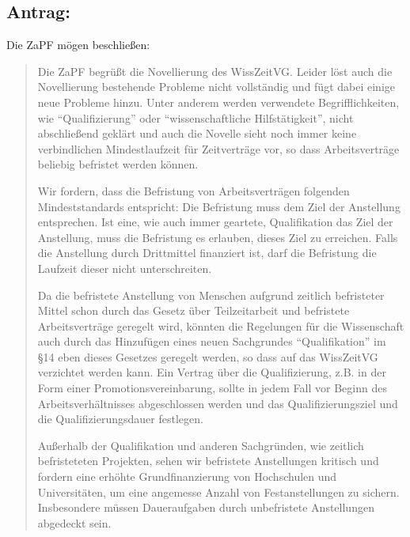 \documentclass[parskip, 10pt,oneside]{scrartcl}
\begin{document}
\subsection*{Antrag:}
Die ZaPF mögen beschließen:
\begin{quote}
Die ZaPF begrüßt die Novellierung des WissZeitVG. Leider löst auch die Novellierung bestehende Probleme nicht vollständig und fügt dabei einige neue Probleme hinzu. 
Unter anderem werden verwendete Begrifflichkeiten, wie ``Qualifizierung'' oder  ``wissenschaftliche Hilfstätigkeit'', nicht abschließend geklärt und auch die Novelle sieht noch immer keine verbindlichen Mindestlaufzeit für Zeitverträge vor, so dass Arbeitsverträge beliebig befristet werden können.

Wir fordern, dass die Befristung von Arbeitsverträgen folgenden Mindeststandards entspricht:
Die Befristung muss dem Ziel der Anstellung entsprechen. Ist eine, wie auch immer geartete, Qualifikation das Ziel der Anstellung, muss die Befristung es erlauben, dieses Ziel zu erreichen.
Falls die Anstellung durch Drittmittel finanziert ist, darf die Befristung die Laufzeit dieser nicht unterschreiten.

Da die befristete Anstellung von Menschen aufgrund zeitlich befristeter Mittel schon durch das Gesetz über Teilzeitarbeit und befristete Arbeitsverträge geregelt wird, könnten die Regelungen für die Wissenschaft auch durch das Hinzufügen eines neuen Sachgrundes ``Qualifikation'' im §14 eben dieses Gesetzes geregelt werden, so dass auf das WissZeitVG verzichtet werden kann.
Ein Vertrag über die Qualifizierung, z.B. in der Form einer Promotionsvereinbarung, sollte in jedem Fall vor Beginn des Arbeitsverhältnisses abgeschlossen werden und das Qualifizierungsziel und die Qualifizierungsdauer festlegen.

Außerhalb der Qualifikation und anderen Sachgründen, wie zeitlich befristeteten Projekten, sehen wir befristete Anstellungen kritisch und fordern eine erhöhte Grundfinanzierung von Hochschulen und Universitäten, um eine angemesse Anzahl von Festanstellungen zu sichern. Insbesondere müssen Daueraufgaben durch unbefristete Anstellungen abgedeckt sein.


\end{quote}
\end{document}

